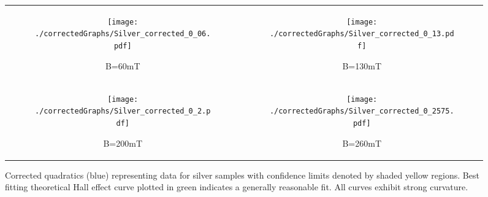 \documentclass[a4paper]{article}
\begin{document}
			\begin{figure}[p]
				\centering
				\begin{tabular}{c|c}
					\begin{subfigure}[t]{0.45\textwidth}
						\centering
						\texttt{[image: ./correctedGraphs/Silver\_corrected\_0\_06.pdf]}
						\caption{B=60mT}
						\label{fig:silverCorrected60}
					\end{subfigure}
					&
					\begin{subfigure}[t]{0.45\textwidth}
						\centering
						\texttt{[image: ./correctedGraphs/Silver\_corrected\_0\_13.pdf]}
						\caption{B=130mT}
						\label{fig:silverCorrected130}
					\end{subfigure}
					\\
					\begin{subfigure}[t]{0.45\textwidth}
						\centering
						\texttt{[image: ./correctedGraphs/Silver\_corrected\_0\_2.pdf]}
						\caption{B=200mT}
						\label{fig:silverCorrected200}
					\end{subfigure}
					&
					\begin{subfigure}[t]{0.45\textwidth}
						\centering
						\texttt{[image: ./correctedGraphs/Silver\_corrected\_0\_2575.pdf]}
						\caption{B=260mT}
						\label{fig:silverCorrected260}
					\end{subfigure}
				\end{tabular}
				\caption{Corrected quadratics (blue) representing data for silver samples with confidence limits denoted by shaded yellow regions. Best fitting theoretical Hall effect curve plotted in green indicates a generally reasonable fit. All curves exhibit strong curvature.}
				\label{fig:silverCorrected}
			\end{figure}
			
\end{document}
